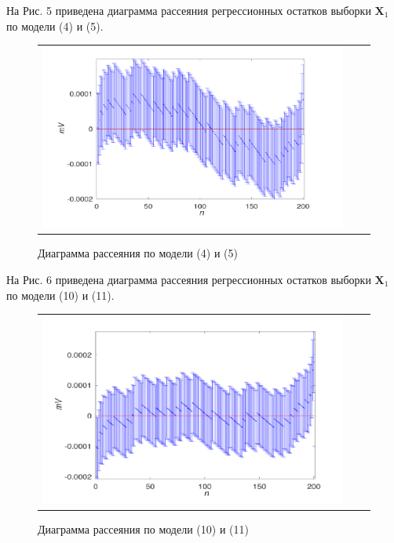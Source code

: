 \documentclass[a4paper,14pt]{article}
\begin{document}
	На Рис. 5 приведена диаграмма рассеяния регрессионных остатков выборки $\textbf{X}_1$ по модели (4) и (5).
	
	\begin{figure}[H]
		\begin{center}
			\begin{tabular}{ccc}
				\includegraphics[scale=0.8]{../image/problem5.png}
			\end{tabular}
		\end{center}
		\caption{Диаграмма рассеяния по модели (4) и (5)} 
	\end{figure}

	На Рис. 6 приведена диаграмма рассеяния регрессионных остатков выборки $\textbf{X}_1$ по модели (10) и (11).
	
	\begin{figure}[H]
		\begin{center}
			\begin{tabular}{ccc}
				\includegraphics[scale=0.8]{../image/problem6.png}
			\end{tabular}
		\end{center}
		\caption{Диаграмма рассеяния по модели (10) и (11)} 
	\end{figure}
\end{document}
